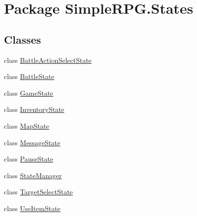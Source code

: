 \hypertarget{namespace_simple_r_p_g_1_1_states}{\section{Package Simple\+R\+P\+G.\+States}
\label{namespace_simple_r_p_g_1_1_states}
}
\subsection*{Classes}
\begin{DoxyCompactItemize}
\item 
class \hyperlink{class_simple_r_p_g_1_1_states_1_1_battle_action_select_state}{Battle\+Action\+Select\+State}
\item 
class \hyperlink{class_simple_r_p_g_1_1_states_1_1_battle_state}{Battle\+State}
\item 
class \hyperlink{class_simple_r_p_g_1_1_states_1_1_game_state}{Game\+State}
\item 
class \hyperlink{class_simple_r_p_g_1_1_states_1_1_inventory_state}{Inventory\+State}
\item 
class \hyperlink{class_simple_r_p_g_1_1_states_1_1_map_state}{Map\+State}
\item 
class \hyperlink{class_simple_r_p_g_1_1_states_1_1_message_state}{Message\+State}
\item 
class \hyperlink{class_simple_r_p_g_1_1_states_1_1_pause_state}{Pause\+State}
\item 
class \hyperlink{class_simple_r_p_g_1_1_states_1_1_state_manager}{State\+Manager}
\item 
class \hyperlink{class_simple_r_p_g_1_1_states_1_1_target_select_state}{Target\+Select\+State}
\item 
class \hyperlink{class_simple_r_p_g_1_1_states_1_1_use_item_state}{Use\+Item\+State}
\end{DoxyCompactItemize}
